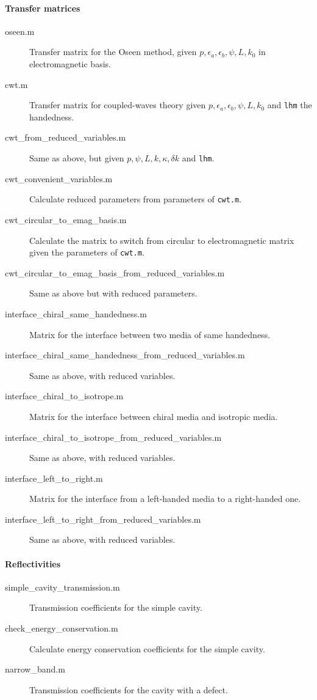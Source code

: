 \paragraph{Transfer matrices}

\begin{description}
	\item[oseen.m] Transfer matrix for the Oseen method, given $p, \epsilon_a, \epsilon_b, \psi, L, k_0$ in electromagnetic basis.
	\item[cwt.m] Transfer matrix for coupled-waves theory given $p, \epsilon_a, \epsilon_b, \psi, L, k_0$ and \verb|lhm| the handedness.
	\item[cwt\_from\_reduced\_variables.m] Same as above, but given $p, \psi, L, k, \kappa, \delta k$ and \verb|lhm|.
	\item[cwt\_convenient\_variables.m] Calculate reduced parameters from parameters of \verb|cwt.m|.
	\item[cwt\_circular\_to\_emag\_basis.m] Calculate the matrix to switch from circular to electromagnetic matrix given the parameters of \verb|cwt.m|.
	\item[cwt\_circular\_to\_emag\_basis\_from\_reduced\_variables.m] Same as above but with reduced parameters.
	\item[interface\_chiral\_same\_handedness.m] Matrix for the interface between two media of same handedness.
	\item[interface\_chiral\_same\_handedness\_from\_reduced\_variables.m] Same as above, with reduced variables.
	\item[interface\_chiral\_to\_isotrope.m] Matrix for the interface between chiral media and isotropic media.
	\item[interface\_chiral\_to\_isotrope\_from\_reduced\_variables.m] Same as above, with reduced variables.
	\item[interface\_left\_to\_right.m] Matrix for the interface from a left-handed media to a right-handed one.
	\item[interface\_left\_to\_right\_from\_reduced\_variables.m] Same as above, with reduced variables.
\end{description}

\paragraph{Reflectivities}

\begin{description}
	\item[simple\_cavity\_transmission.m] Transmission coefficients for the simple cavity.
	\item[check\_energy\_conservation.m] Calculate energy conservation coefficients for the simple cavity.
	\item[narrow\_band.m] Transmission coefficients for the cavity with a defect.
\end{description}

